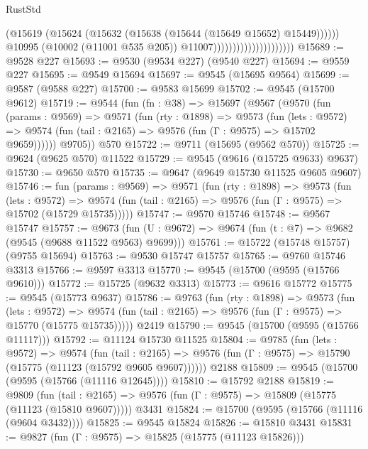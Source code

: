 \begin{lexlean}{RustStd}
\begin{coremodule}
                                                (@15619
                                                  (@15624
                                                    (@15632
                                                      (@15638 (@15644 (@15649 @15652) @15449))))))
                                              @10995
                                              (@10002 (@11001 @535 @205))
                                              @11007)))))))))))))))))))))
@15689 := @9528 @227
@15693 := @9530 (@9534 @227) (@9540 @227)
@15694 := @9559 @227
@15695 := @9549 @15694
@15697 := @9545 (@15695 @9564)
@15699 := @9587 (@9588 @227)
@15700 := @9583 @15699
@15702 := @9545 (@15700 @9612)
@15719 := @9544
    (fun (fn : @38) =>
    @15697
      (@9567
        (@9570
          (fun (params : @9569) =>
          @9571
            (fun (rty : @1898) =>
            @9573
              (fun (lets : @9572) =>
              @9574 (fun (tail : @2165) => @9576 (fun (Γ : @9575) => @15702 @9659))))))
        @9705))
    @570
@15722 := @9711 (@15695 (@9562 @570))
@15725 := @9624 (@9625 @570) @11522
@15729 := @9545 (@9616 (@15725 @9633) @9637)
@15730 := @9650 @570
@15735 := @9647 (@9649 @15730 @11525 @9605 @9607)
@15746 := fun (params : @9569) =>
  @9571
    (fun (rty : @1898) =>
    @9573
      (fun (lets : @9572) =>
      @9574 (fun (tail : @2165) => @9576 (fun (Γ : @9575) => @15702 (@15729 @15735)))))
@15747 := @9570 @15746
@15748 := @9567 @15747
@15757 := @9673
    (fun (U : @9672) => @9674 (fun (t : @7) => @9682 (@9545 (@9688 @11522 @9563) @9699)))
@15761 := @15722 (@15748 @15757) (@9755 @15694)
@15763 := @9530 @15747 @15757
@15765 := @9760 @15746 @3313
@15766 := @9597 @3313
@15770 := @9545 (@15700 (@9595 (@15766 @9610)))
@15772 := @15725 (@9632 @3313)
@15773 := @9616 @15772
@15775 := @9545 (@15773 @9637)
@15786 := @9763
    (fun (rty : @1898) =>
    @9573
      (fun (lets : @9572) =>
      @9574 (fun (tail : @2165) => @9576 (fun (Γ : @9575) => @15770 (@15775 @15735)))))
    @2419
@15790 := @9545 (@15700 (@9595 (@15766 @11117)))
@15792 := @11124 @15730 @11525
@15804 := @9785
    (fun (lets : @9572) =>
    @9574
      (fun (tail : @2165) =>
      @9576 (fun (Γ : @9575) => @15790 (@15775 (@11123 (@15792 @9605 @9607))))))
    @2188
@15809 := @9545 (@15700 (@9595 (@15766 (@11116 @12645))))
@15810 := @15792 @2188
@15819 := @9809
    (fun (tail : @2165) => @9576 (fun (Γ : @9575) => @15809 (@15775 (@11123 (@15810 @9607)))))
    @3431
@15824 := @15700 (@9595 (@15766 (@11116 (@9604 @3432))))
@15825 := @9545 @15824
@15826 := @15810 @3431
@15831 := @9827 (fun (Γ : @9575) => @15825 (@15775 (@11123 @15826)))

\end{coremodule}
\end{lexlean}

